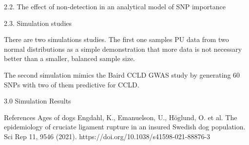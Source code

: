 2.2. The effect of non-detection in an analytical model of SNP importance

2.3. Simulation studies

There are two simulations studies. The first one samples PU data from two normal distributions as a simple demonstration that more data is not necessary better than a smaller, balanced sample size. 

The second simulation mimics the Baird CCLD GWAS study by generating 60 SNPs with two of them predictive for CCLD. 

3.0 Simulation Results

References
Ages of dogs
Engdahl, K., Emanuelson, U., Höglund, O. et al. The epidemiology of cruciate ligament rupture in an insured Swedish dog population. Sci Rep 11, 9546 (2021). https://doi.org/10.1038/s41598-021-88876-3

